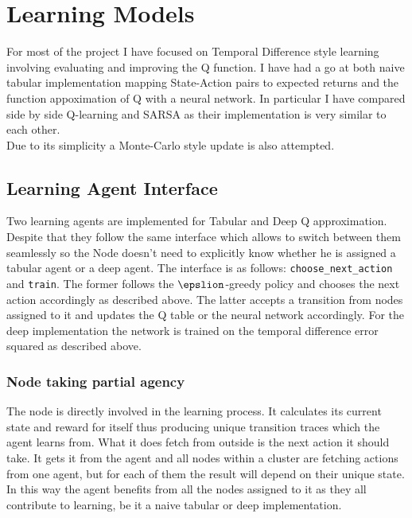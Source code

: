 \section{Learning Models}

For most of the project I have focused on Temporal Difference
style learning involving evaluating and improving the Q
function. I have had a go at both naive tabular implementation
mapping State-Action pairs to expected returns and the 
function appoximation of Q with a neural network. 
In particular I have compared side by side Q-learning and SARSA
as their implementation is very similar to each other. \\

Due to its simplicity a Monte-Carlo style update is also 
attempted.
 
\subsection{Learning Agent Interface}
Two learning agents are implemented for Tabular and Deep Q approximation. Despite that they follow the same interface
which allows to switch between them seamlessly so the Node
doesn't need to explicitly know whether he is assigned a 
tabular agent or a deep agent. The interface is as follows:
\texttt{choose\_next\_action} and \texttt{train}. The former 
follows the $\epslion$-greedy policy and chooses the next 
action accordingly as described above. The latter accepts
a transition from nodes assigned to it and updates the Q table
or the neural network accordingly. For the deep implementation
the network is trained on the temporal difference error squared
as described above. \\

\subsubsection{Node taking partial agency}

The node is directly involved in the learning process. 
It calculates its current state and reward for itself thus
producing  unique transition traces which the agent learns from. 
What it does fetch from outside is the next action it should
take. It gets it from the agent and all nodes within a cluster
are fetching actions from one agent, but for each of them
the result will depend on their unique state.\\

In this way the agent benefits from all the nodes assigned to 
it as they all contribute to learning, be it a naive tabular or
deep implementation.


